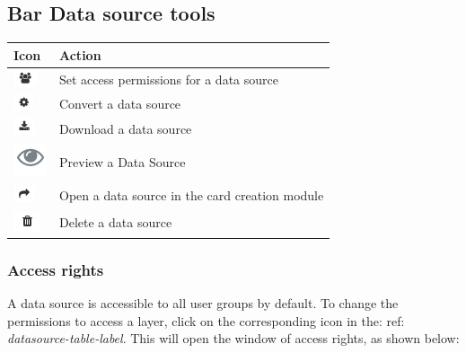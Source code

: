 \documentclass[letterpaper,10pt,english]{sphinxmanual}
\begin{document}
\subsection{Bar Data source tools}
\label{data/datasources:barre-d-outils-des-sources-de-donnees}\label{data/datasources:datasource-table-label}
\begin{tabulary}{\linewidth}{|L|L|}
\hline

\textbf{Icon}
 & 
\textbf{Action}
\\
\hline
\includegraphics{privileges.png}
 & 
Set access permissions for a data source
\\
\hline
\includegraphics{process1.png}
 & 
Convert a data source
\\
\hline
\includegraphics{download.png}
 & 
Download a data source
\\
\hline
\includegraphics{preview.png}
 & 
Preview a Data Source
\\
\hline
\includegraphics{share.png}
 & 
Open a data source in the card creation module
\\
\hline
\includegraphics{delete.png}
 & 
Delete a data source
\\
\hline\end{tabulary}



\subsubsection{Access rights}
\label{data/datasources:droits-d-acces}
A data source is accessible to all user groups by default. To change the permissions to access a layer, click on the corresponding icon in the: ref: \emph{datasource-table-label}. This will open the window of access rights, as shown below:
\end{document}
